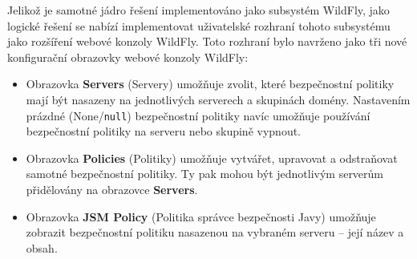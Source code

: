 Jelikož je samotné jádro řešení implementováno jako subsystém WildFly, jako logické řešení se nabízí implementovat uživatelské rozhraní tohoto subsystému jako rozšíření webové konzoly WildFly.
Toto rozhraní bylo navrženo jako tři nové konfigurační obrazovky webové konzoly WildFly:

\begin{itemize}
  \item Obrazovka {\bf Servers} (Servery) umožňuje zvolit, které bezpečnostní politiky mají být nasazeny na jednotlivých serverech a skupinách domény. Nastavením prázdné (None/{\tt null}) bezpečnostní politiky navíc umožňuje používání bezpečnostní politiky na serveru nebo skupině vypnout.
  \item Obrazovka {\bf Policies} (Politiky) umožňuje vytvářet, upravovat a odstraňovat samotné bezpečnostní politiky. Ty pak mohou být jednotlivým serverům přidělovány na obrazovce {\bf Servers}.
  \item Obrazovka {\bf JSM Policy} (Politika správce bezpečnosti Javy) umožňuje zobrazit bezpečnostní politiku nasazenou na vybraném serveru -- její název a obsah.
\end{itemize}

